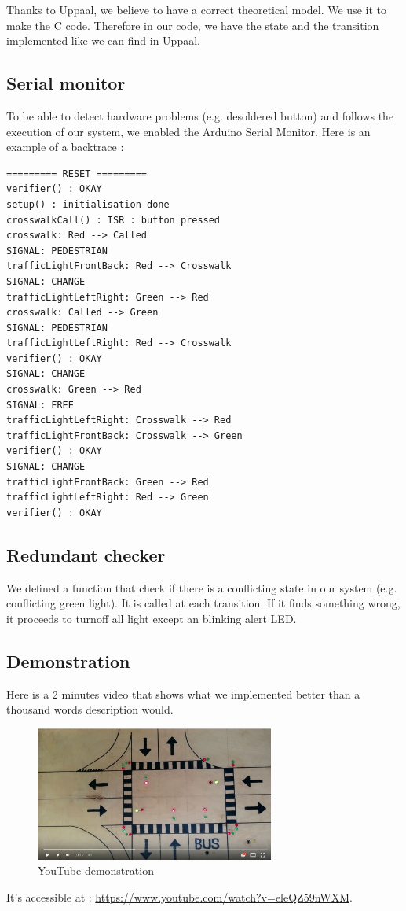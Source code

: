 Thanks to Uppaal, we believe to have a correct theoretical model. We use it to make the C code. Therefore in our code, we have the state and the transition implemented like we can find in Uppaal.

\subsection{Serial monitor}

To be able to detect hardware problems (e.g. desoldered button) and follows the execution of our system, we enabled the Arduino Serial Monitor. Here is an example of a backtrace :

\begin{verbatim}
========= RESET =========
verifier() : OKAY
setup() : initialisation done
crosswalkCall() : ISR : button pressed
crosswalk: Red --> Called
SIGNAL: PEDESTRIAN
trafficLightFrontBack: Red --> Crosswalk
SIGNAL: CHANGE
trafficLightLeftRight: Green --> Red
crosswalk: Called --> Green
SIGNAL: PEDESTRIAN
trafficLightLeftRight: Red --> Crosswalk
verifier() : OKAY
SIGNAL: CHANGE
crosswalk: Green --> Red
SIGNAL: FREE
trafficLightLeftRight: Crosswalk --> Red
trafficLightFrontBack: Crosswalk --> Green
verifier() : OKAY
SIGNAL: CHANGE
trafficLightFrontBack: Green --> Red
trafficLightLeftRight: Red --> Green
verifier() : OKAY
\end{verbatim}

\subsection{Redundant checker}

We defined a function that check if there is a conflicting state in our system (e.g. conflicting green light). It is called at each transition. If it finds something wrong, it proceeds to turnoff all light except an blinking alert LED.


\subsection{Demonstration}

Here is a 2 minutes video that shows what we implemented better than a thousand words description would.

\begin{figure}[H]\label{fig:ytv}
  \centering
    \includegraphics[width=0.7\textwidth]{picture/demo.png}
    \caption{YouTube demonstration}
\end{figure}

It's accessible at :  \url{https://www.youtube.com/watch?v=eleQZ59nWXM}.